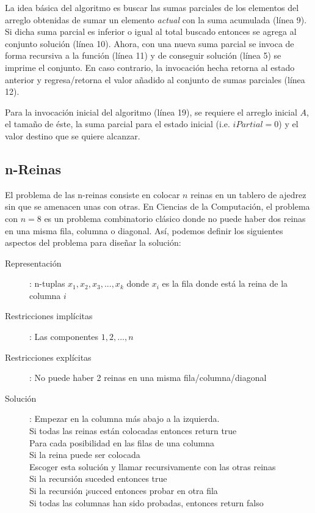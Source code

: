La idea básica del algoritmo es buscar las sumas parciales de los elementos del arreglo obtenidas de sumar un elemento \textit{actual} con la suma acumulada (línea 9). Si dicha suma parcial es inferior o igual al total buscado entonces se agrega al conjunto solución (línea 10). Ahora, con una nueva suma parcial se invoca de forma recursiva a la función (línea 11) y de conseguir solución (línea 5) se imprime el conjunto. En caso contrario, la invocación hecha retorna al estado anterior y regresa/retorna el valor añadido al conjunto de sumas parciales (línea 12).

Para la invocación inicial del algoritmo (línea 19), se requiere el arreglo inicial $A$, el tamaño de éste, la suma parcial para el estado inicial (i.e. $iPartial = 0$) y el valor destino que se quiere alcanzar.

\subsection{n-Reinas}

El problema de las n-reinas consiste en colocar $n$ reinas en un tablero de ajedrez sin que se amenacen unas con otras. En Ciencias de la Computación, el problema con $n=8$ es un problema combinatorio clásico donde no puede haber dos reinas en una misma fila, columna o diagonal. Así, podemos definir los siguientes aspectos del problema para diseñar la solución:

\begin{description}
\item [Representación]: n-tuplas $x_1, x_2, x_3,..., x_k$ donde $x_i$ es la fila donde está la reina de la columna $i$
\item [Restricciones implícitas]: Las componentes $1, 2,..., n$
\item [Restricciones explícitas]: No puede haber 2 reinas en una misma fila/columna/diagonal
\item [Solución]: Empezar en la columna más abajo a la izquierda. \\
Si todas las reinas están colocadas entonces return true \\
Para cada posibilidad en las filas de una columna \\
    Si la reina puede ser colocada \\
    Escoger esta solución y llamar recursivamente con las otras reinas \\
    Si la recursión suceded entonces true \\
    Si la recursión ¡succed entonces probar en otra fila \\
Si todas las columnas han sido probadas, entonces return falso \\
\end{description}

